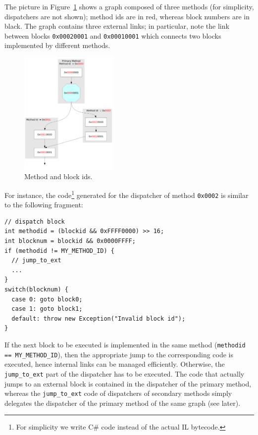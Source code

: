 The picture in Figure~\ref{block-id-fig} shows a graph composed of three methods (for
simplicity, dispatchers are not shown); method ids are in red, whereas
block numbers are in black. 
The graph contains three external links; in particular, note the link
between blocks \texttt{0x00020001} and \texttt{0x00010001} which
connects two blocks implemented by different methods.
\begin{figure}[h]
\begin{center}
\includegraphics[height=6cm]{blockid}
\caption{Method and block ids.}\label{block-id-fig}
\end{center}
\end{figure}

For instance, the code\footnote{For simplicity we write C\# code instead of
the actual IL bytecode.} generated for the dispatcher of method \texttt{0x0002}
is similar to the following fragment: 
\begin{small}
\begin{lstlisting}[language={[Sharp]C}]
// dispatch block
int methodid = (blockid && 0xFFFF0000) >> 16; 
int blocknum = blockid && 0x0000FFFF;         
if (methodid != MY_METHOD_ID) {
  // jump_to_ext 
  ...
}
switch(blocknum) {
  case 0: goto block0;
  case 1: goto block1;
  default: throw new Exception("Invalid block id");
}
\end{lstlisting}
\end{small}
If the next block to be executed is implemented in the same method
({\small\lstinline{methodid == MY_METHOD_ID}}), then the appropriate
jump to the corresponding code is executed, hence internal links
can be managed efficiently.
Otherwise, the \lstinline{jump_to_ext}
part of the dispatcher has to be executed.
The code that actually jumps to an external block is contained in
the dispatcher of the primary method, whereas the
\lstinline{jump_to_ext} code of dispatchers of secondary methods
simply delegates the dispatcher of the primary method of the same
graph (see later).

